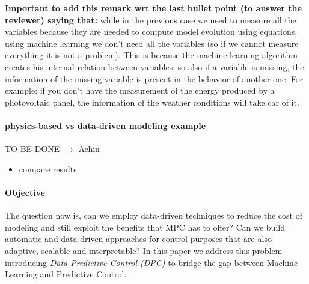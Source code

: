 \textcolor[rgb]{0,0,1}{\textbf{Important to add this remark wrt the last bullet point (to answer the reviewer) saying that:} while in the previous case we need to measure all the variables because they are needed to compute model evolution using equations, using machine learning we don't need all the variables (so if we cannot measure everything it is not a problem). This is because the machine learning algorithm creates his internal relation between variables, so also if a variable is missing, the information of the missing variable is present in the behavior of another one. For example: if you don't have the measurement of the energy produced by a photovoltaic panel, the information of the weather conditions will take car of it.}


\paragraph{physics-based vs data-driven modeling example}
TO BE DONE $\rightarrow$ \textcolor[rgb]{0,0,1}{Achin}
\begin{itemize}
	\item compare results
\end{itemize}

\paragraph{Objective} The question now is, can we employ data-driven techniques to reduce the cost of modeling and still exploit the benefits that MPC has to offer? Can we build automatic and data-driven approaches for control purposes that are also adaptive, scalable and interpretable? In this paper we address this problem introducing \textit{Data Predictive Control (DPC)} to bridge the gap between Machine Learning and Predictive Control.

